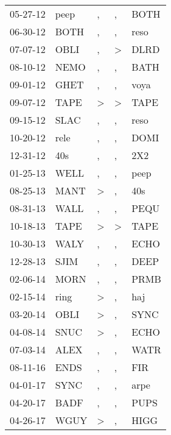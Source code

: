 \begin{supertabular}{lllll}
 05-27-12 &   peep &                , &             , &   BOTH \\
 06-30-12 &   BOTH &                , &             , &   reso \\
 07-07-12 &   OBLI &                , &  \textgreater &   DLRD \\
 08-10-12 &   NEMO &                , &             , &   BATH \\
 09-01-12 &   GHET &                , &             , &   voya \\
 09-07-12 &   TAPE &     \textgreater &  \textgreater &   TAPE \\
 09-15-12 &   SLAC &                , &             , &   reso \\
 10-20-12 &   rele &                , &             , &   DOMI \\
 12-31-12 &    40s &                , &             , &    2X2 \\
 01-25-13 &   WELL &                , &             , &   peep \\
 08-25-13 &   MANT &     \textgreater &             , &    40s \\
 08-31-13 &   WALL &                , &             , &   PEQU \\
 10-18-13 &   TAPE &     \textgreater &  \textgreater &   TAPE \\
 10-30-13 &   WALY &                , &             , &   ECHO \\
 12-28-13 &   SJIM &                , &             , &   DEEP \\
 02-06-14 &   MORN &                , &             , &   PRMB \\
 02-15-14 &   ring &     \textgreater &             , &    haj \\
 03-20-14 &   OBLI &     \textgreater &             , &   SYNC \\
 04-08-14 &   SNUC &     \textgreater &             , &   ECHO \\
 07-03-14 &   ALEX &                , &             , &   WATR \\
 08-11-16 &   ENDS &                , &             , &    FIR \\
 04-01-17 &   SYNC &                , &             , &   arpe \\
 04-20-17 &   BADF &                , &             , &   PUPS \\
 04-26-17 &   WGUY &     \textgreater &             , &   HIGG \\

\end{supertabular}
